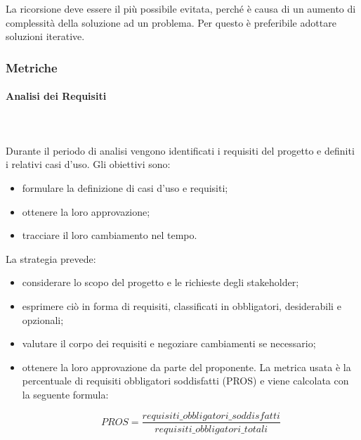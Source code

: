 		 \mbox{} \\ \mbox{} \\
		La ricorsione deve essere il più possibile evitata, perché è causa di un aumento di complessità della soluzione ad un problema. Per questo è preferibile adottare soluzioni iterative.
	\subsubsection{Metriche}
			\paragraph{Analisi dei Requisiti} \mbox{} \\ \mbox{} \\
			Durante il periodo di analisi vengono identificati i requisiti del progetto e definiti i relativi casi d'uso. 
			Gli obiettivi sono:
			\begin{itemize}
			\item  formulare la definizione di casi d'uso e requisiti;
			\item ottenere la loro approvazione;
			\item tracciare il loro cambiamento nel tempo.
			\end{itemize}
			La strategia prevede:
			\begin{itemize}
			\item considerare lo scopo del progetto e le richieste degli stakeholder;
			\item esprimere ciò in forma di requisiti, classificati in obbligatori, desiderabili e opzionali;
			\item valutare il corpo dei requisiti e negoziare cambiamenti se necessario;
			\item ottenere la loro approvazione da parte del proponente.
			La metrica usata è la percentuale di requisiti obbligatori soddisfatti (PROS) e viene
calcolata con la seguente formula: 

		\[ PROS = \frac{requisiti\_obbligatori\_soddisfatti}{requisiti\_obbligatori\_totali} \]
	
			\end{itemize}
